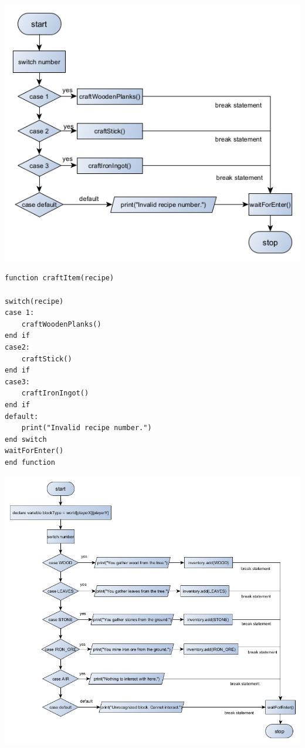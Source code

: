 {\includegraphics[width=\textwidth]{../flowchart/craftItem.png}}
\begin{lstlisting}
function craftItem(recipe)

switch(recipe)
case 1: 
	craftWoodenPlanks()
end if
case2: 
	craftStick()
end if
case3:
	craftIronIngot()
end if
default: 
	print("Invalid recipe number.")
end switch
waitForEnter()
end function
\end{lstlisting}
\newpage

{\includegraphics[width=\textwidth]{../flowchart/interactWithWorld.png}}


